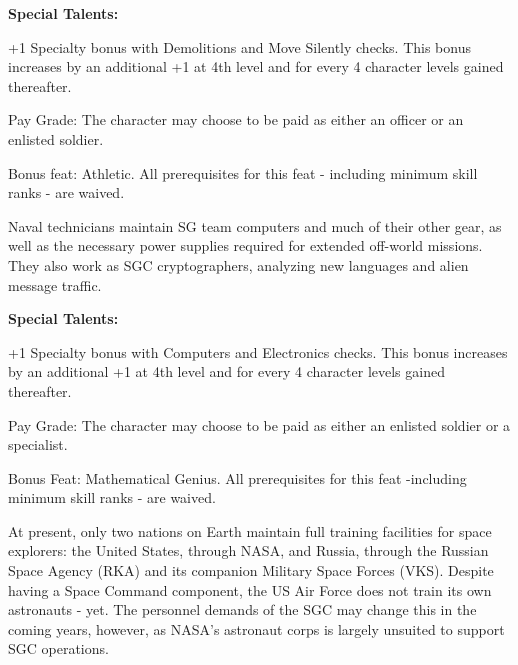 \textbf{Special Talents:}
\begin{itemize*}
\item +1 Specialty bonus with Demolitions and Move Silently checks. This bonus increases by an additional +1 at 4th level and for every 4 character levels gained thereafter.
\item Pay Grade: The character may choose to be paid as either an officer or an enlisted soldier.
\item Bonus feat: Athletic. All prerequisites for this feat - including minimum skill ranks - are waived.
\end{itemize*}

Naval technicians maintain SG team computers and much of their other gear, as well as the necessary power supplies required for extended off-world missions. They also work as SGC cryptographers, analyzing new languages and alien message traffic.

\textbf{Special Talents:}
\begin{itemize*}
\item +1 Specialty bonus with Computers and Electronics checks. This bonus increases by an additional +1 at 4th level and for every 4 character levels gained thereafter.
\item Pay Grade: The character may choose to be paid as either an enlisted soldier or a specialist.
\item Bonus Feat: Mathematical Genius. All prerequisites for this feat -including minimum skill ranks - are waived.
\end{itemize*}

At present, only two nations on Earth maintain full training facilities for space explorers: the United States, through NASA, and Russia, through the Russian Space Agency (RKA) and its companion Military Space Forces (VKS). Despite having a Space Command component, the US Air Force does not train its own astronauts - yet. The personnel demands of the SGC may change this in the coming years, however, as NASA's astronaut corps is largely unsuited to support SGC operations.

